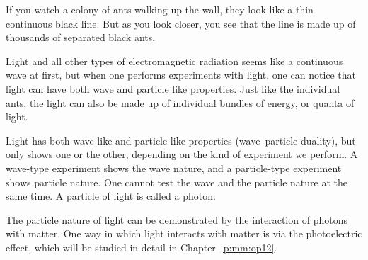 \vspace{-0.5cm}

If you watch a colony of ants walking up the wall, they look like a thin continuous black line.  But as you look closer, you see that the line is made up of thousands of separated black ants.

Light and all other types of electromagnetic radiation seems like a continuous wave at first, but when one performs experiments with light, one can notice that light can have both wave and particle like properties.  Just like the individual ants, the light can also be made up of individual bundles of energy, or quanta of light.

Light has both wave-like and particle-like properties (wave--particle duality), but only shows one or the other, depending on the kind of experiment we perform. A wave-type experiment shows the wave nature, and a particle-type experiment shows particle nature.  One cannot test the wave and the particle nature at the same time. A particle of light is called a photon.

\vspace{-2cm} %


\vspace{-0.1cm}

The particle nature of light can be demonstrated by the interaction of photons with matter.  One way in which light interacts with matter is via the photoelectric effect, which will be studied in detail in Chapter~\ref{p:mm:op12}.

\clearpage


